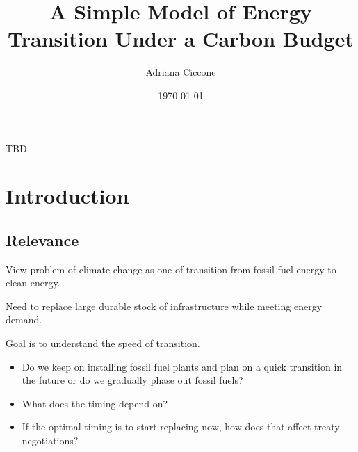 \documentclass[singlespace]{easychithesis}
\begin{document}
\title{A Simple Model of Energy Transition Under a Carbon Budget} 
\author{Adriana Ciccone}
\date{\today}
\maketitle




TBD



%
%

\tableofcontents

%
%
\mainmatter

\chapter{Introduction}
\section{Relevance}

View problem of climate change as one of transition from fossil fuel energy to clean energy.

Need to replace large durable stock of infrastructure while meeting energy demand.

Goal is to understand the speed of transition.

\begin{itemize}
	\item{Do we keep on installing fossil fuel plants and plan on a quick transition in the future or do we gradually phase out fossil fuels?}
	\item{What does the timing depend on?}
	\item{If the optimal timing is to start replacing now, how does that affect treaty negotiations?}
\end{itemize}
\end{document}
